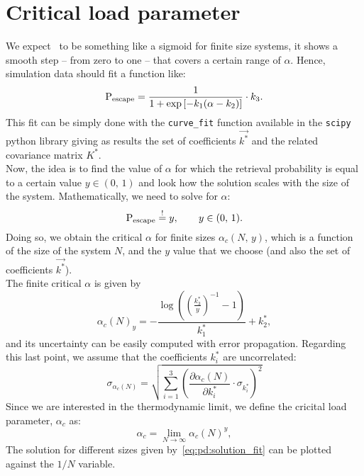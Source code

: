 \documentclass[\rootdir/main.tex]{subfiles}
\begin{document}
\section{Critical load parameter}
We expect \pesc\ to be something like a sigmoid for finite size systems, \ie it shows a smooth step -- from zero to one --  that covers a certain range of $\alpha$. Hence, simulation data should fit a function like:
\begin{equation}\label{eq:fit_pesc}
     \mathrm{P}_{\text{escape}} = \frac{1}{1 + \exp \left[ - k_1 (\alpha - k_2) \right]} \cdot k_3.
\end{equation}
This fit can be simply done with the \texttt{curve\_fit} function available in the \texttt{scipy} python library giving as results the set of coefficients $\vec{k^*}$ and the related covariance matrix $K^*$.\\
Now, the idea is to find the value of $\alpha$ for which the retrieval probability is equal to a certain value $y \in (0,\, 1)$ and look how the solution scales with the size of the system. Mathematically, we need to solve for $\alpha$:
\begin{equation}\label{eq:finite_critical_alpha}
     \mathrm{P}_{\text{escape}}  \overset{!}{=} y, \qquad y \in (0,\, 1).
\end{equation}
Doing so, we obtain the critical $\alpha$ for finite sizes $\alpha_c\left(N,\,y\right)$, which is a function of the size of the system $N$, and the $y$ value that we choose (and also the set of coefficients $\vec{k^*}$).\\
The finite critical $\alpha$ is given by
\begin{equation}\label{eq:pd:solution_fit}
    \alpha_c(N)_{y} = - \frac{\log\left(\left(\frac{k_3^*}{y}\right)^{-1} - 1\right)}{k_1^*} + k_2^*,
\end{equation}
and its uncertainty can be easily computed with error propagation. Regarding this last point, we assume that the coefficients $k_{i}^{*}$ are uncorrelated:
\begin{equation}
    \sigma_{\alpha_c(N)} = \sqrt{ \sum_{i = 1}^{3} \left( \frac{\partial \alpha_c(N)}{\partial k_i^*} \cdot \sigma_{k_i^*} \right)^2 }   
\end{equation}
Since we are interested in the thermodynamic limit, we define the cricital load parameter, $\alpha_c$ as:
\begin{equation}\label{eq:critical_alpha}
    \alpha_c = \lim_{N \to \infty} \alpha_c(N)^{y},
 \end{equation}
 The solution for different sizes given by~\cref{eq:pd:solution_fit} can be plotted against the $1/N$ variable.
\end{document}
